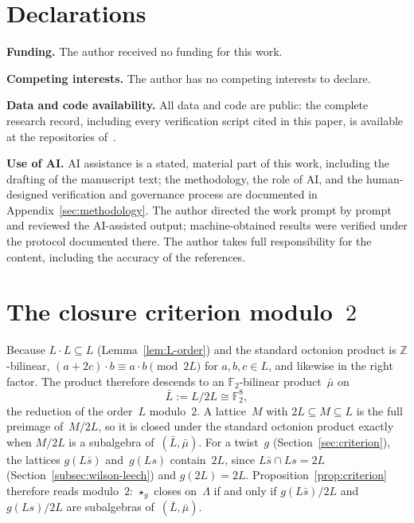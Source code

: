 \documentclass[twoside,english]{paper}
\numberwithin{equation}{section}
\numberwithin{figure}{section}
\theoremstyle{definition}
\theoremstyle{remark}
\newcommand{\ZZ}{\mathbb{Z}}
\newcommand{\FF}{\mathbb{F}}
\newcommand{\LL}{\Lambda}             %
\begin{document}
\section*{Declarations}

\textbf{Funding.}  The author received no funding for this work.

\textbf{Competing interests.}  The author has no competing interests
to declare.

\textbf{Data and code availability.}  All data and code are public:
the complete research record, including every verification script
cited in this paper, is available at the repositories of~\cite{repo}.

\textbf{Use of AI.}  AI assistance is a stated, material part of this
work, including the drafting of the manuscript text; the methodology,
the role of AI, and the human-designed verification and governance
process are documented in Appendix~\ref{sec:methodology}.  The author directed the work prompt
by prompt and reviewed the AI-assisted output; machine-obtained results
were verified under the protocol documented there.  The author takes
full responsibility for the content, including the accuracy of the
references.

\appendix
\section{The closure criterion modulo~\texorpdfstring{$2$}{2}}\label{sec:appendix-tables}\label{app:mod2quotient}

Because $L \cdot L \subseteq L$ (Lemma~\ref{lem:L-order}) and the
standard octonion product is $\ZZ$-bilinear, $(a + 2c) \cdot b \equiv a \cdot
b \pmod{2L}$ for $a, b, c \in L$, and likewise in the right factor.  The
product therefore descends to an $\FF_2$-bilinear product~$\bar\mu$ on
\begin{equation}\label{eq:disp14}
  \bar L := L/2L \cong \FF_2^8,
\end{equation}
the reduction of the order~$L$ modulo~$2$.  A lattice~$M$ with
$2L \subseteq M \subseteq L$ is the full preimage of~$M/2L$, so it is
closed under the standard octonion product exactly when $M/2L$ is a
subalgebra of~$(\bar L, \bar\mu)$.  For a twist~$g$
(Section~\ref{sec:criterion}), the lattices $g(L\bar s)$ and~$g(Ls)$
contain~$2L$, since $L\bar s \cap Ls = 2L$
(Section~\ref{subsec:wilson-leech}) and $g(2L) = 2L$.
Proposition~\ref{prop:criterion} therefore reads modulo~$2$: $\star_g$
closes on~$\LL$ if and only if $g(L\bar s)/2L$ and~$g(Ls)/2L$ are
subalgebras of~$(\bar L, \bar\mu)$.
\end{document}

